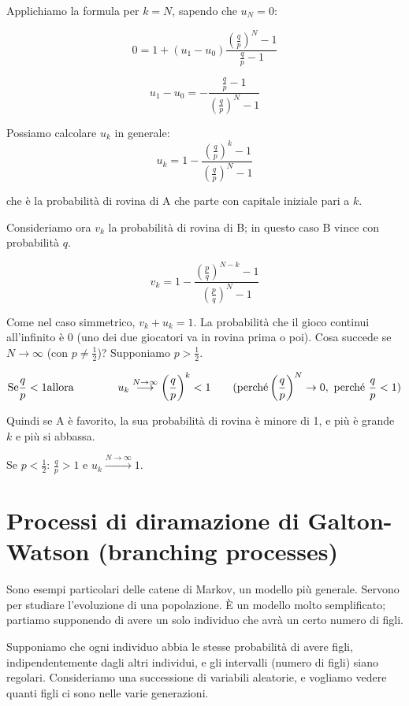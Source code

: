\documentclass[a4paper,12pt]{book}
\newcommand\ddfrac[2]{\frac{\displaystyle #1}{\displaystyle #2}}
\begin{document}
Applichiamo la formula per $ k = N $, sapendo che $ u_N = 0 $:

$$ 0 = 1 + (u_1 - u_0) \ddfrac{\left(\ddfrac{q}{p}\right)^N - 1}{\ddfrac{q}{p} - 1} $$

$$ u_1 - u_0 = - \ddfrac{\ddfrac{q}{p} - 1}{\left(\ddfrac{q}{p}\right)^N - 1} $$

Possiamo calcolare $ u_k $ in generale:
$$ u_k = 1 - \ddfrac{\left(\ddfrac{q}{p}\right)^k - 1}{\left(\ddfrac{q}{p}\right)^N - 1} $$

che è la probabilità di rovina di A che parte con capitale iniziale pari a $ k $. 

Consideriamo ora $ v_k $ la probabilità di rovina di B; in questo caso B vince con probabilità $ q $.

$$ v_k = 1 - \ddfrac{\left(\ddfrac{p}{q}\right)^{N-k} - 1}{\left(\ddfrac{p}{q}\right)^N - 1} $$

Come nel caso simmetrico, $ v_k + u_k = 1 $. La probabilità che il gioco continui all'infinito è 0 (uno dei due giocatori va in rovina prima o poi). Cosa succede se $ N \to \infty $ (con $ p \ne \frac{1}{2} $)? Supponiamo $ p > \frac{1}{2} $. 

$$ \textnormal{Se} \frac{q}{p} < 1 \textnormal{allora} \qquad \qquad u_k \stackrel{N \to \infty}{\longrightarrow} \left(\frac{q}{p}\right)^k < 1 \qquad (\text{perché} \left(\frac{q}{p}\right)^N \to 0, \text{ perché } \frac{q}{p} < 1) $$

Quindi se A è favorito, la sua probabilità di rovina è minore di 1, e più è grande $ k $ e più si abbassa.

Se $ p < \ddfrac{1}{2} $: $ \ddfrac{q}{p} > 1 $ e $ u_k \stackrel{N \to \infty}{\longrightarrow} 1 $.

\section{Processi di diramazione di Galton-Watson (branching processes)}
Sono esempi particolari delle catene di Markov, un modello più generale. Servono per studiare l'evoluzione di una popolazione. È un modello molto semplificato; partiamo supponendo di avere un solo individuo che avrà un certo numero di figli. 

Supponiamo che ogni individuo abbia le stesse probabilità di avere figli, indipendentemente dagli altri individui, e gli intervalli (numero di figli) siano regolari. Consideriamo una successione di variabili aleatorie, e vogliamo vedere quanti figli ci sono nelle varie generazioni.
\end{document}
